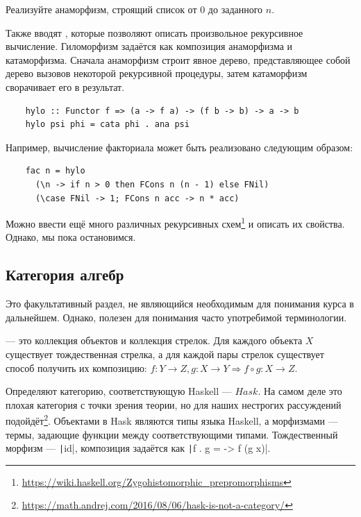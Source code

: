 \begin{task}
    Реализуйте анаморфизм, строящий список от $0$ до заданного $n$.
\end{task}

Также вводят , которые позволяют описать произвольное рекурсивное вычисление.
Гиломорфизм задаётся как композиция анаморфизма и катаморфизма.
Сначала анаморфизм строит явное дерево, представляющее собой дерево вызовов некоторой рекурсивной процедуры, затем катаморфизм сворачивает его в результат.
\begin{verbatim}
    hylo :: Functor f => (a -> f a) -> (f b -> b) -> a -> b
    hylo psi phi = cata phi . ana psi
\end{verbatim}

Например, вычисление факториала может быть реализовано следующим образом:
\begin{verbatim}
    fac n = hylo
      (\n -> if n > 0 then FCons n (n - 1) else FNil)
      (\case FNil -> 1; FCons n acc -> n * acc)
\end{verbatim}

Можно ввести ещё много различных рекурсивных схем\footnote{\url{https://wiki.haskell.org/Zygohistomorphic_prepromorphisms}} и описать их свойства.
Однако, мы пока остановимся.


\subsection{Категория алгебр} \label{subsec:cats}

Это факультативный раздел, не являющийся необходимым для понимания курса в дальнейшем.
Однако, полезен для понимания часто употребимой терминологии.

 --- это коллекция объектов и коллекция стрелок.
Для каждого объекта $X$ существует тождественная стрелка, а для каждой пары стрелок существует способ получить их композицию: $f : Y \to Z, g : X \to Y \Rightarrow f \circ g : X \to Z$.

Определяют категорию, соответствующую Haskell --- $Hask$.
На самом деле это плохая категория с точки зрения теории, но для наших нестрогих рассуждений подойдёт\footnote{\url{https://math.andrej.com/2016/08/06/hask-is-not-a-category/}}.
Объектами в Hask являются типы языка Haskell, а морфизмами --- термы, задающие функции между соответствующими типами.
Тождественный морфизм --- \texttt|id|, композиция задаётся как \texttt|f . g = \x -> f (g x)|.

